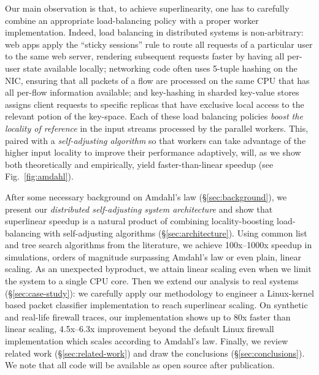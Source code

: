 Our main observation is that, to achieve superlinearity, one has to carefully combine an appropriate load-balancing policy with a proper worker implementation. Indeed, load balancing in distributed systems is non-arbitrary: web apps apply the ``sticky sessions'' rule to route all requests of a particular user to the same web server, rendering subsequent requests faster by having all per-user state available locally; networking code often uses 5-tuple hashing on the NIC, ensuring that all packets of a flow are processed on the same CPU that has all per-flow information  available; and key-hashing in sharded key-value stores assigns client requests to specific replicas that have exclusive local access to the relevant potion of the key-space. Each of these load balancing policies \emph{boost the locality of reference} in the input streams processed by the parallel workers. This, paired with a \emph{self-adjusting algorithm} so that workers can take advantage of the higher input locality to improve their performance adaptively, will, as we show both theoretically and empirically, yield faster-than-linear speedup (see Fig.~\ref{fig:amdahl}). %

After some necessary background on Amdahl's law (\S\ref{sec:background}), we present our \emph{distributed self-adjusting system architecture} and show that superlinear speedup is a natural product of combining locality-boosting load-balancing with self-adjusting algorithms (\S\ref{sec:architecture}). Using common list and tree search algorithms from the literature, we achieve 100x--1000x speedup in simulations, orders of magnitude surpassing Amdahl's law or even plain, linear scaling. As an unexpected byproduct, we attain linear scaling even when we limit the system to a single CPU core. Then we extend our analysis to real systems (\S\ref{sec:case-study}): we carefully apply our methodology to engineer a Linux-kernel based packet classifier implementation to reach superlinear scaling. On synthetic and real-life firewall traces, our implementation shows up to 80x faster than linear scaling, 4.5x--6.3x improvement beyond the default Linux firewall implementation which scales according to Amdahl's law. Finally, we review related work (\S\ref{sec:related-work}) and draw the conclusions (\S\ref{sec:conclusions}). We note that all code will be available as open source after publication.


